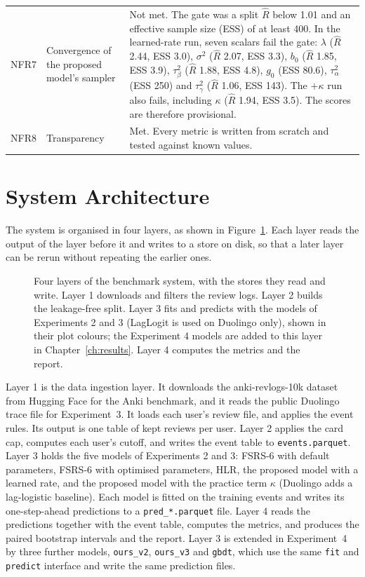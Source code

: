 \begin{table}[!htbp]
\begin{tabular}{@{}p{1.2cm}p{4.1cm}p{8.9cm}@{}}
    NFR7 & Convergence of the proposed model's sampler & Not met. The gate was a split $\hat{R}$ below 1.01 and an effective sample size (ESS) of at least 400. In the learned-rate run, seven scalars fail the gate: $\lambda$ ($\hat{R}$ 2.44, ESS 3.0), $\sigma^2$ ($\hat{R}$ 2.07, ESS 3.3), $b_0$ ($\hat{R}$ 1.85, ESS 3.9), $\tau^2_\beta$ ($\hat{R}$ 1.88, ESS 4.8), $g_0$ (ESS 80.6), $\tau^2_\alpha$ (ESS 250) and $\tau^2_\gamma$ ($\hat{R}$ 1.06, ESS 143). The $+\kappa$ run also fails, including $\kappa$ ($\hat{R}$ 1.94, ESS 3.5). The scores are therefore provisional. \\
    NFR8 & Transparency & Met. Every metric is written from scratch and tested against known values. \\
    \bottomrule
  \end{tabular}
\end{table}

\section{System Architecture}
\label{sec:design-architecture}

The system is organised in four layers, as shown in Figure~\ref{fig:tk_architecture}. Each layer reads
the output of the layer before it and writes to a store on disk, so that a later layer can be rerun without
repeating the earlier ones.

\begin{figure}[htbp]
  \centering
  
  \caption{Four layers of the benchmark system, with the stores they read and write. Layer 1 downloads and
    filters the review logs. Layer 2 builds the leakage-free split. Layer 3 fits and predicts with the models of Experiments 2 and 3 (LagLogit is used on Duolingo only), shown in their plot colours; the Experiment 4 models are added to this layer in Chapter~\ref{ch:results}. Layer 4 computes the metrics and the report.}
  \label{fig:tk_architecture}
\end{figure}

Layer 1 is the data ingestion layer. It downloads the anki-revlogs-10k dataset from Hugging Face for the Anki benchmark, and it reads the public Duolingo trace file for Experiment~3. It loads each
user's review file, and applies the event rules. Its output is one table of kept reviews per user. Layer 2
applies the card cap, computes each user's cutoff, and writes the event table to \texttt{events.parquet}.
Layer 3 holds the five models of Experiments 2 and 3: FSRS-6 with default parameters, FSRS-6 with optimised parameters, HLR, the
proposed model with a learned rate, and the proposed model with the practice term $\kappa$ (Duolingo adds a lag-logistic baseline). Each model is fitted
on the training events and writes its one-step-ahead predictions to a \texttt{pred\_*.parquet} file. Layer 4
reads the predictions together with the event table, computes the metrics, and produces the paired bootstrap
intervals and the report. Layer 3 is extended in Experiment~4 by three further models, \texttt{ours\_v2}, \texttt{ours\_v3} and \texttt{gbdt}, which use the same \texttt{fit} and \texttt{predict} interface and write the same prediction files.

